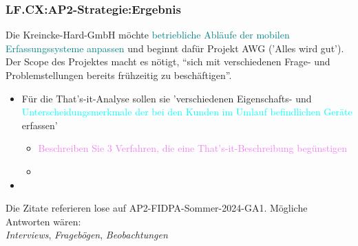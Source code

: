 \begin{frame}  
  \frametitle{LF.CX:AP2-Strategie:Ergebnis}

  \begin{footnotesize}
    Die Kreincke-Hard-GmbH möchte \textcolor{teal}{betriebliche Abläufe der mobilen Erfassungssysteme anpassen} und beginnt dafür Projekt AWG ('Alles wird gut'). Der Scope des Projektes macht es nötigt, \enquote{sich mit verschiedenen Frage- und Problemstellungen bereits frühzeitig zu beschäftigen}.

  \begin{itemize}
    \item[a] Für die That's-it-Analyse sollen sie 'verschiedenen Eigenschafts- und \textcolor{cyan}{Unterscheidungsmerkmale der bei den Kunden im Umlauf befindlichen Geräte} erfassen'
    \begin{itemize}
      \item[aa] \textcolor{violet}{Beschreiben Sie 3 Verfahren, die eine That's-it-Beschreibung begünstigen}
      \item[...]
    \end{itemize}
    \item[...]
  \end{itemize}
  
  \end{footnotesize}

  
  \vspace{0.5cm}
  \begin{tiny}
  \begin{flushright}
    Die Zitate referieren lose auf AP2-FIDPA-Sommer-2024-GA1. Mögliche Antworten wären:\\ \textit{Interviews}, \textit{Fragebögen}, \textit{Beobachtungen}
  \end{flushright}
  \end{tiny}

\end{frame}